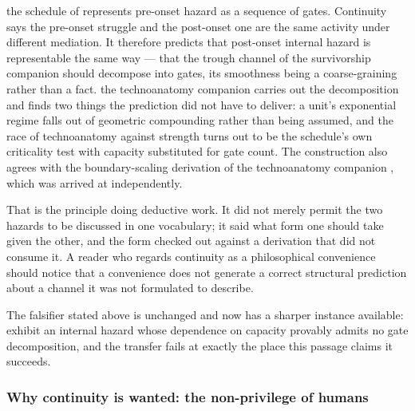 the schedule of \cite{GoldenTechnoanatomy} represents pre-onset hazard as a sequence of
gates. Continuity says the pre-onset struggle and the post-onset one are
the same activity under different mediation. It therefore predicts that
post-onset internal hazard is representable the same way --- that the
trough channel of the survivorship companion \cite{GoldenSurvivorship} should decompose into gates, its
smoothness being a coarse-graining rather than a fact.
the technoanatomy companion \cite{GoldenTechnoanatomy} carries out the decomposition and
finds two things the prediction did not have to deliver: a unit's exponential
regime falls out of geometric compounding rather than being assumed, and
the race of technoanatomy against strength turns out to be the schedule's own criticality
test with capacity substituted for gate count. The construction also
agrees with the boundary-scaling derivation of
the technoanatomy companion \cite{GoldenTechnoanatomy}, which was arrived at independently.

That is the principle doing deductive work. It did not merely permit the
two hazards to be discussed in one vocabulary; it said what form one
should take given the other, and the form checked out against a
derivation that did not consume it. A reader who regards continuity as a
philosophical convenience should notice that a convenience does not
generate a correct structural prediction about a channel it was not
formulated to describe.

The falsifier stated above is unchanged and now has a sharper instance
available: exhibit an internal hazard whose dependence on capacity
provably admits no gate decomposition, and the transfer fails at exactly
the place this passage claims it succeeds.

\subsubsection{Why continuity is wanted: the non-privilege of humans}
\label{gc:subsub:nonprivilege}

